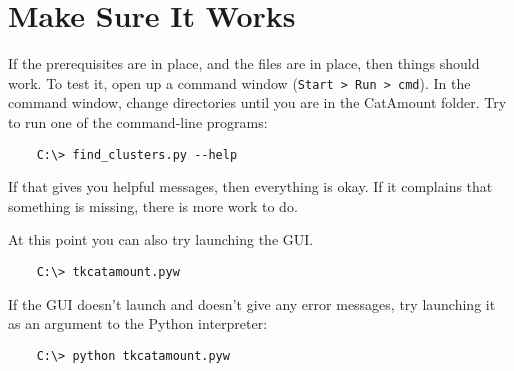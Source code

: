 \section{Make Sure It Works}

If the prerequisites are in place, and the files are in place, then things
should work. To test it, open up a command window (\verb=Start > Run > cmd=).
In the command window, change directories until you are in the CatAmount
folder. Try to run one of the command-line programs:

\begin{verbatim}
    C:\> find_clusters.py --help
\end{verbatim}

If that gives you helpful messages, then everything is okay. If it complains
that something is missing, there is more work to do.

At this point you can also try launching the GUI.

\begin{verbatim}
    C:\> tkcatamount.pyw
\end{verbatim}

If the GUI doesn't launch and doesn't give any error messages, try launching
it as an argument to the Python interpreter:

\begin{verbatim}
    C:\> python tkcatamount.pyw
\end{verbatim}

